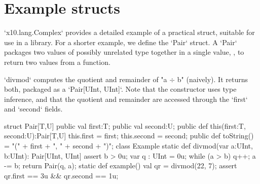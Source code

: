  
  
\section{Example structs}

\xcd`x10.lang.Complex` provides a detailed example of a practical struct,
suitable for use in a library.  For a shorter example, we define the
\xcd`Pair` struct.   A \xcd`Pair` packages
two values of possibly unrelated type together in a single value, \eg, to
return two values from a function.  

\xcd`divmod` computes the quotient and remainder of \xcdmath"a $\div$ b" (naively).
It returns both, packaged as a \xcd`Pair[UInt, UInt]`.  Note that the
constructor uses type inference, and that the quotient and remainder are
accessed through the \xcd`first` and \xcd`second` fields.
\begin{xten}
struct Pair[T,U] {
    public val first:T;
    public val second:U;
    public def this(first:T, second:U):Pair[T,U] {
        this.first = first;
        this.second = second;
    }
    public def toString() 
        = "(" + first + ", " + second + ")";
}
class Example {
  static def divmod(var a:UInt, b:UInt): Pair[UInt, UInt] {
     assert b > 0u;
     var q : UInt = 0u;
     while (a > b) {q++; a -= b;}
     return Pair(q, a); 
  }
  static def example() {
     val qr = divmod(22, 7);
     assert qr.first == 3u && qr.second == 1u;
  }
}
\end{xten}

